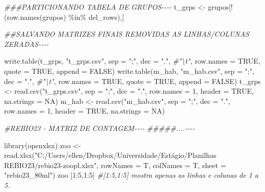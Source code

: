 \documentclass[
  letterpaper,
  DIV=11,
  numbers=noendperiod]{scrartcl}
\newenvironment{Shaded}{}{}
\newcommand{\AttributeTok}[1]{\textcolor[rgb]{0.49,0.56,0.16}{#1}}
\newcommand{\CommentTok}[1]{\textcolor[rgb]{0.38,0.63,0.69}{\textit{#1}}}
\newcommand{\ConstantTok}[1]{\textcolor[rgb]{0.53,0.00,0.00}{#1}}
\newcommand{\DecValTok}[1]{\textcolor[rgb]{0.25,0.63,0.44}{#1}}
\newcommand{\DocumentationTok}[1]{\textcolor[rgb]{0.73,0.13,0.13}{\textit{#1}}}
\newcommand{\FunctionTok}[1]{\textcolor[rgb]{0.02,0.16,0.49}{#1}}
\newcommand{\NormalTok}[1]{#1}
\newcommand{\OtherTok}[1]{\textcolor[rgb]{0.00,0.44,0.13}{#1}}
\newcommand{\SpecialCharTok}[1]{\textcolor[rgb]{0.25,0.44,0.63}{#1}}
\newcommand{\StringTok}[1]{\textcolor[rgb]{0.25,0.44,0.63}{#1}}
\begin{document}
\begin{Shaded}
\begin{Highlighting}[numbers=left,,]
\DocumentationTok{\#\#\#PARTICIONANDO TABELA DE GRUPOS{-}{-}{-}{-}}
\NormalTok{t\_grps }\OtherTok{\textless{}{-}}\NormalTok{ grupos[}\SpecialCharTok{!}\NormalTok{(}\FunctionTok{row.names}\NormalTok{(grupos) }\SpecialCharTok{\%in\%}\NormalTok{ del\_rows),]}


\DocumentationTok{\#\#SALVANDO MATRIZES FINAIS REMOVIDAS AS LINHAS/COLUNAS ZERADAS{-}{-}{-}{-}}

\FunctionTok{write.table}\NormalTok{(t\_grps, }\StringTok{"t\_grps.csv"}\NormalTok{,}
            \AttributeTok{sep =} \StringTok{";"}\NormalTok{, }\AttributeTok{dec =} \StringTok{"."}\NormalTok{, }\CommentTok{\#"\textbackslash{}t",}
            \AttributeTok{row.names =} \ConstantTok{TRUE}\NormalTok{,}
            \AttributeTok{quote =} \ConstantTok{TRUE}\NormalTok{,}
            \AttributeTok{append =} \ConstantTok{FALSE}\NormalTok{)}
\FunctionTok{write.table}\NormalTok{(m\_hab, }\StringTok{"m\_hab.csv"}\NormalTok{,}
            \AttributeTok{sep =} \StringTok{";"}\NormalTok{, }\AttributeTok{dec =} \StringTok{"."}\NormalTok{, }\CommentTok{\#"\textbackslash{}t",}
            \AttributeTok{row.names =} \ConstantTok{TRUE}\NormalTok{,}
            \AttributeTok{quote =} \ConstantTok{TRUE}\NormalTok{,}
            \AttributeTok{append =} \ConstantTok{FALSE}\NormalTok{)}
\NormalTok{t\_grps }\OtherTok{\textless{}{-}} \FunctionTok{read.csv}\NormalTok{(}\StringTok{"t\_grps.csv"}\NormalTok{,}
                   \AttributeTok{sep =} \StringTok{";"}\NormalTok{, }\AttributeTok{dec =} \StringTok{"."}\NormalTok{,}
                   \AttributeTok{row.names =} \DecValTok{1}\NormalTok{,}
                   \AttributeTok{header =} \ConstantTok{TRUE}\NormalTok{,}
                   \AttributeTok{na.strings =} \ConstantTok{NA}\NormalTok{)}
\NormalTok{m\_hab }\OtherTok{\textless{}{-}} \FunctionTok{read.csv}\NormalTok{(}\StringTok{"m\_hab.csv"}\NormalTok{,}
                   \AttributeTok{sep =} \StringTok{";"}\NormalTok{, }\AttributeTok{dec =} \StringTok{"."}\NormalTok{,}
                   \AttributeTok{row.names =} \DecValTok{1}\NormalTok{,}
                   \AttributeTok{header =} \ConstantTok{TRUE}\NormalTok{,}
                   \AttributeTok{na.strings =} \ConstantTok{NA}\NormalTok{)}

\CommentTok{\#REBIO23 {-} MATRIZ DE CONTAGEM{-}{-}{-}{-}}
\DocumentationTok{\#\#\#\#\#....{-}{-}{-}{-}}

\FunctionTok{library}\NormalTok{(openxlsx)}
\NormalTok{zoo }\OtherTok{\textless{}{-}} \FunctionTok{read.xlsx}\NormalTok{(}\StringTok{"C:/Users/ellen/Dropbox/Universidade/Estágio/Planilhas REBIO23/rebio23{-}zoopl.xlsx"}\NormalTok{,}
                       \AttributeTok{rowNames =}\NormalTok{ T,}
                       \AttributeTok{colNames =}\NormalTok{ T,}
                       \AttributeTok{sheet =} \StringTok{"rebio23\_80ml"}\NormalTok{)}
\NormalTok{zoo [}\DecValTok{1}\SpecialCharTok{:}\DecValTok{5}\NormalTok{,}\DecValTok{1}\SpecialCharTok{:}\DecValTok{5}\NormalTok{] }\CommentTok{\#[1:5,1:5] mostra apenas as linhas e colunas de 1 a 5.}


\end{Highlighting}
\end{Shaded}
\end{document}
